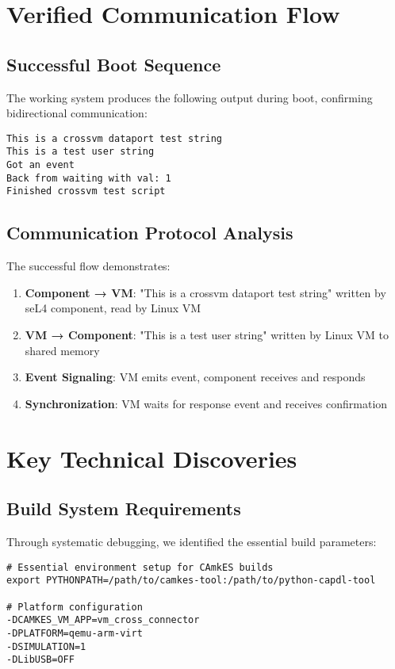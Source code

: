 \documentclass[12pt,a4paper]{article}
\begin{document}
\section{Verified Communication Flow}

\subsection{Successful Boot Sequence}

The working system produces the following output during boot, confirming bidirectional communication:

\begin{lstlisting}[style=bash, caption=Confirmed working output]
This is a crossvm dataport test string
This is a test user string
Got an event
Back from waiting with val: 1
Finished crossvm test script
\end{lstlisting}

\subsection{Communication Protocol Analysis}

The successful flow demonstrates:

\begin{enumerate}
\item \textbf{Component → VM}: "This is a crossvm dataport test string" written by seL4 component, read by Linux VM
\item \textbf{VM → Component}: "This is a test user string" written by Linux VM to shared memory
\item \textbf{Event Signaling}: VM emits event, component receives and responds
\item \textbf{Synchronization}: VM waits for response event and receives confirmation
\end{enumerate}

\section{Key Technical Discoveries}

\subsection{Build System Requirements}

Through systematic debugging, we identified the essential build parameters:

\begin{lstlisting}[style=bash, caption=Working build configuration]
# Essential environment setup for CAmkES builds
export PYTHONPATH=/path/to/camkes-tool:/path/to/python-capdl-tool

# Platform configuration
-DCAMKES_VM_APP=vm_cross_connector
-DPLATFORM=qemu-arm-virt 
-DSIMULATION=1
-DLibUSB=OFF
\end{lstlisting}
\end{document}
